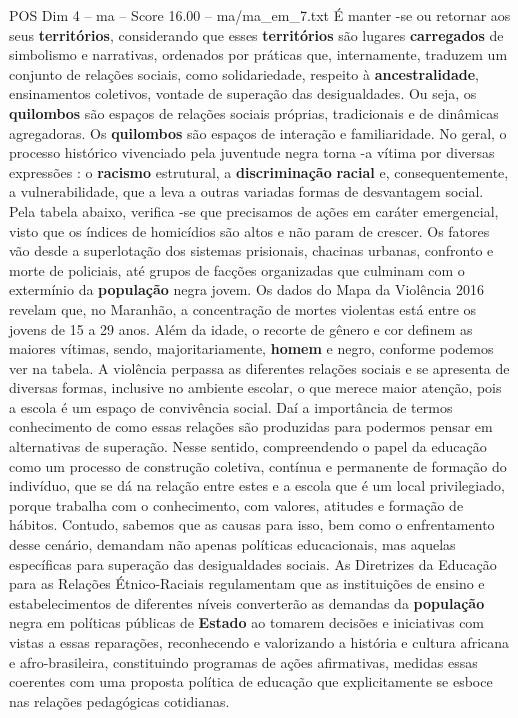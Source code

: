 \begin{textsample}{POS Dim 4 – ma – Score 16.00 – ma/ma\_em\_7.txt}
É manter -se ou retornar aos seus \textbf{territórios}, considerando que esses \textbf{territórios} são lugares \textbf{carregados} de simbolismo e narrativas, ordenados por práticas que, internamente, traduzem um conjunto de relações sociais, como solidariedade, respeito à \textbf{ancestralidade}, ensinamentos coletivos, vontade de superação das desigualdades.
Ou seja, os \textbf{quilombos} são espaços de relações sociais próprias, tradicionais e de dinâmicas agregadoras.
Os \textbf{quilombos} são espaços de interação e familiaridade.
No geral, o processo histórico vivenciado pela juventude negra torna -a vítima por diversas expressões : o \textbf{racismo} estrutural, a \textbf{discriminação} \textbf{racial} e, consequentemente, a vulnerabilidade, que a leva a outras variadas formas de desvantagem social.
Pela tabela abaixo, verifica -se que precisamos de ações em caráter emergencial, visto que os índices de homicídios são altos e não param de crescer.
Os fatores vão desde a superlotação dos sistemas prisionais, chacinas urbanas, confronto e morte de policiais, até grupos de facções organizadas que culminam com o extermínio da \textbf{população} negra jovem.
Os dados do Mapa da Violência 2016 revelam que, no Maranhão, a concentração de mortes violentas está entre os jovens de 15 a 29 anos.
Além da idade, o recorte de gênero e cor definem as maiores vítimas, sendo, majoritariamente, \textbf{homem} e negro, conforme podemos ver na tabela.
A violência perpassa as diferentes relações sociais e se apresenta de diversas formas, inclusive no ambiente escolar, o que merece maior atenção, pois a escola é um espaço de convivência social.
Daí a importância de termos conhecimento de como essas relações são produzidas para podermos pensar em alternativas de superação.
Nesse sentido, compreendendo o papel da educação como um processo de construção coletiva, contínua e permanente de formação do indivíduo, que se dá na relação entre estes e a escola que é um local privilegiado, porque trabalha com o conhecimento, com valores, atitudes e formação de hábitos.
Contudo, sabemos que as causas para isso, bem como o enfrentamento desse cenário, demandam não apenas políticas educacionais, mas aquelas específicas para superação das desigualdades sociais.
As Diretrizes da Educação para as Relações Étnico-Raciais regulamentam que as instituições de ensino e estabelecimentos de diferentes níveis converterão as demandas da \textbf{população} negra em políticas públicas de \textbf{Estado} ao tomarem decisões e iniciativas com vistas a essas reparações, reconhecendo e valorizando a história e cultura africana e afro-brasileira, constituindo programas de ações afirmativas, medidas essas coerentes com uma proposta política de educação que explicitamente se esboce nas relações pedagógicas cotidianas.

\end{textsample}
